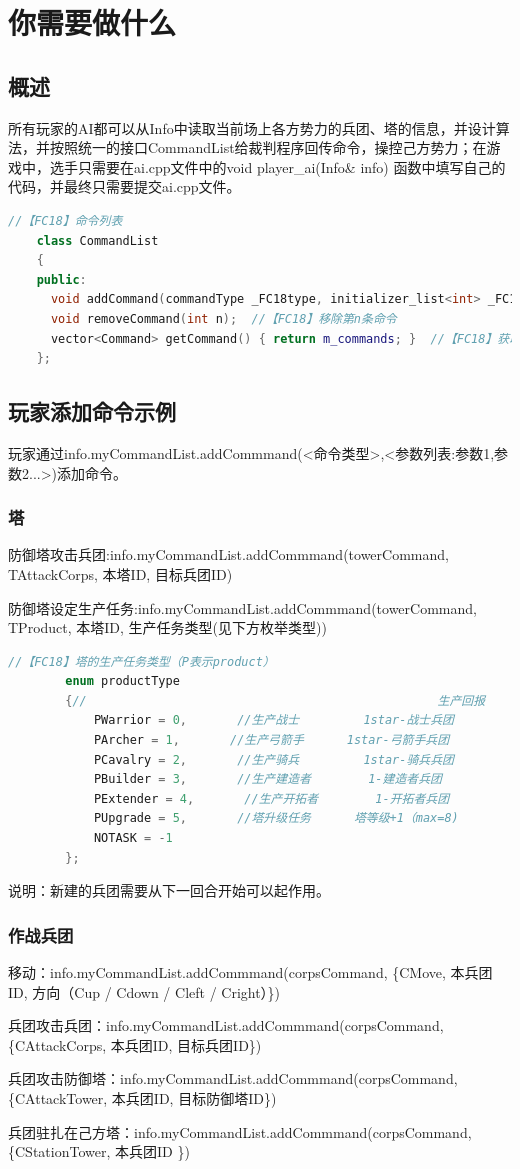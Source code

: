 \documentclass[a4paper,4pt]{article}
\begin{document}
\section{你需要做什么}
\subsection{概述}
所有玩家的AI都可以从Info中读取当前场上各方势力的兵团、塔的信息，并设计算法，并按照统一的接口CommandList给裁判程序回传命令，操控己方势力；在游戏中，选手只需要在ai.cpp文件中的void player\_ai(Info\& info) {  }函数中填写自己的代码，并最终只需要提交ai.cpp文件。
\begin{lstlisting}[language={C++},title={添加命令有关代码}]  %插入代码块
    //【FC18】命令列表
    class CommandList
    {
    public:
      void addCommand(commandType _FC18type, initializer_list<int> _FC18parameters);
      void removeCommand(int n);  //【FC18】移除第n条命令
      vector<Command> getCommand() { return m_commands; }  //【FC18】获取所有命令
    };
\end{lstlisting}

\subsection{玩家添加命令示例}
玩家通过info.myCommandList.addCommmand(<命令类型>,<参数列表:参数1,参数2...>)添加命令。
\subsubsection{塔}
防御塔攻击兵团:info.myCommandList.addCommmand(towerCommand, {TAttackCorps, 本塔ID, 目标兵团ID})\par
防御塔设定生产任务:info.myCommandList.addCommmand(towerCommand, {TProduct, 本塔ID, 生产任务类型(见下方枚举类型)})\par
\begin{lstlisting}[language={C++},title={生产任务类型}]  %插入代码块
		//【FC18】塔的生产任务类型（P表示product）
		enum productType
		{//                                                 生产回报
			PWarrior = 0,       //生产战士         1star-战士兵团
			PArcher = 1,       //生产弓箭手      1star-弓箭手兵团
			PCavalry = 2,       //生产骑兵         1star-骑兵兵团
			PBuilder = 3,       //生产建造者        1-建造者兵团
			PExtender = 4,       //生产开拓者        1-开拓者兵团
			PUpgrade = 5,       //塔升级任务      塔等级+1（max=8)
			NOTASK = -1
		};
\end{lstlisting}
说明：新建的兵团需要从下一回合开始可以起作用。
\subsubsection{作战兵团}
移动：info.myCommandList.addCommmand(corpsCommand, \{CMove, 本兵团ID, 方向（Cup / Cdown / Cleft / Cright）\})\par
兵团攻击兵团：info.myCommandList.addCommmand(corpsCommand, \{CAttackCorps, 本兵团ID, 目标兵团ID\})\par
兵团攻击防御塔：info.myCommandList.addCommmand(corpsCommand, \{CAttackTower, 本兵团ID, 目标防御塔ID\})\par
兵团驻扎在己方塔：info.myCommandList.addCommmand(corpsCommand, \{CStationTower, 本兵团ID \}) \par
\end{document}
